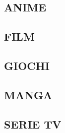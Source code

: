 \documentclass[12pt, a4paper] {article} %
\begin{document}
	\newpage
	\begin{center}
		
		\section[Anime]{{\Huge ANIME}}
		
	\end{center}
		 
	
	
	
	
	
	
	\newpage	
	\begin{center}
		
		\section[Film]{{\Huge FILM}}
		
	\end{center}
	
	
	
	\newpage
	
	\begin{center}
		
		\section[Giochi]{{\Huge GIOCHI}}
		
	\end{center}
	
		
	
	\newpage
	\begin{center}
		
		\section[Manga]{{\Huge MANGA}}
		
	\end{center}
	
		
	
	\newpage
	\begin{center}
		
		\section[Serie TV]{{\Huge SERIE TV}}
		
	\end{center}
			
\end{document}

